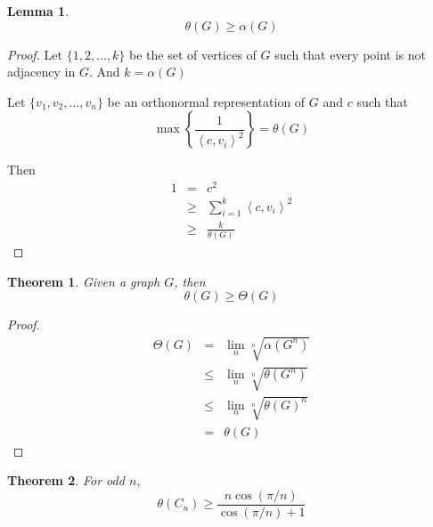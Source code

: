 \documentclass{article}
\newtheorem{lemma}{Lemma}[section]
\newtheorem{theorem}{Theorem}[section]
\begin{document}
      \begin{lemma}
            \begin{equation}
                  \theta(G) \geq \alpha(G)
            \end{equation}
      \end{lemma}

      \begin{proof}
            Let $ \{1,2,\dots,k\} $ be the set of vertices of $ G $ such that every point is not adjacency in $ G $. And $ k = \alpha(G) $

            Let $ \{v_1, v_2, \dots, v_n\} $ be an orthonormal representation of $ G $ and $ c $ such that
            \begin{equation}
                  \max \left\{ \frac{1}{\left<c,v_{i}\right>^2} \right\} = \theta(G)
            \end{equation}
                  
            Then
            \begin{eqnarray}
                  1 &=& c^{2} \\
                  &\geq& \sum_{i=1}^{k} \left<c,v_{i}\right>^{2} \\
                  &\geq& \frac{k}{\theta(G)}
            \end{eqnarray}
      \end{proof}

      \begin{theorem}
            Given a graph $ G $, then
            \begin{equation}
                  \theta(G) \geq \Theta(G)
            \end{equation}
      \end{theorem}

      \begin{proof}
            \begin{eqnarray}
                  \Theta(G) &=& \lim_{n} \sqrt[n]{\alpha(G^{n})} \\
                  &\leq& \lim_{n} \sqrt[n]{\theta(G^{n})} \\
                  &\leq& \lim_{n} \sqrt[n]{\theta(G)^{n}} \\
                  &=& \theta(G)
            \end{eqnarray}
      \end{proof}

      \begin{theorem}
            For odd $ n $,
            \begin{equation}
                  \theta(C_{n}) \geq \frac{n\cos(\pi/n)}{
                        \cos(\pi/n)+1
                  }
            \end{equation} 
      \end{theorem}
\end{document}
